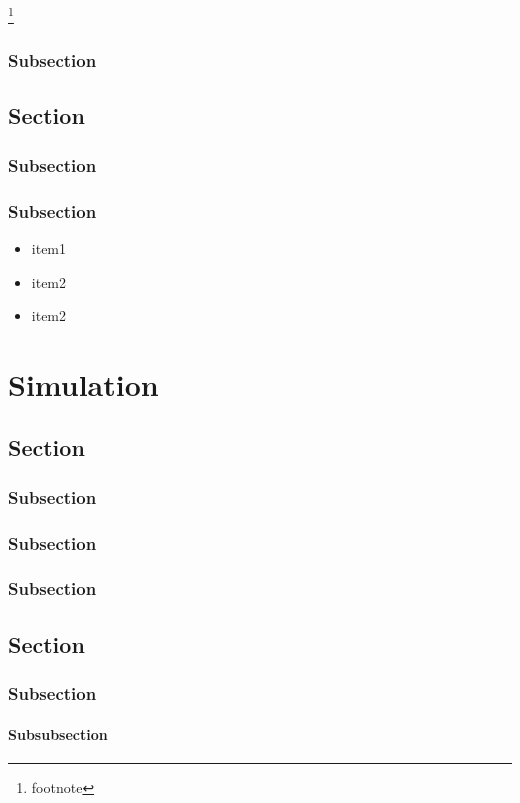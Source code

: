 \documentclass[a4paper]{report}
\begin{document}
	\footnote{footnote}

\subsection{Subsection}

\section{Section}
\subsection{Subsection}
\subsection{Subsection}

	\begin{itemize}
		\item item1
		\item item2
		\item item2
	\end{itemize}

\chapter{Simulation}
\section{Section}
\subsection{Subsection}
\subsection{Subsection}
\subsection{Subsection}

\section{Section}
\subsection{Subsection}
\subsubsection{Subsubsection}
\end{document}
